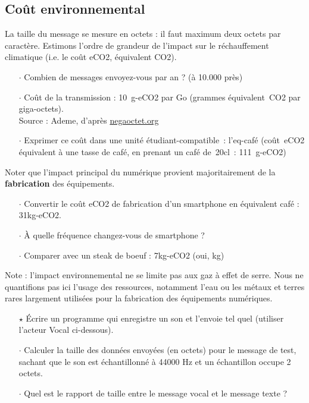 

\subsection*{Coût environnemental}

La taille du message se mesure en octets : il faut maximum deux octets par caractère.
Estimons l'ordre de grandeur de l'impact sur le réchauffement climatique (i.e. le coût eCO2, équivalent CO2).

\begin{itemize}[itemsep=0.2ex]
\item[$\cdot$] Combien de messages envoyez-vous par an ? (à 10.000 près)
\item[$\cdot$] Coût de la transmission : 10~g-eCO2 par Go (grammes équivalent~CO2 par giga-octets).\\
  {\small Source : Ademe, d'après \url{negaoctet.org}}
\item[$\cdot$] Exprimer ce coût dans une unité étudiant-compatible~: l'eq-café (coût~eCO2 équivalent à une tasse de café, en prenant un café de~20cl~: 111~g-eCO2)
\end{itemize}

Noter que l'impact principal du numérique provient majoritairement de la \textbf{fabrication} des équipements.

\begin{itemize}[itemsep=0.2ex]
\item[$\cdot$] Convertir le coût eCO2 de fabrication d'un smartphone en équivalent café : 31kg-eCO2.
\item[$\cdot$] À quelle fréquence changez-vous de smartphone ?
\item[$\cdot$] Comparer avec un steak de boeuf : 7kg-eCO2 (oui, kg) {\footnotesize \color{gray}{(à quelle fréquence mangez-vous du boeuf ?)}}
\end{itemize}

\medskip

Note : l'impact environnemental ne se limite pas aux gaz à effet de serre. Nous ne quantifions pas ici l'usage des ressources, notamment l'eau ou les métaux et terres rares largement utilisées pour la fabrication des équipements numériques.



\begin{itemize}
\item[$\star$] Écrire un programme qui enregistre un son et l'envoie tel quel (utiliser l'acteur Vocal ci-dessous).
\item[$\cdot$] Calculer la taille des données envoyées (en octets) pour le message de test, sachant que le son est échantillonné à 44000 Hz et un échantillon occupe 2 octets.
\item[$\cdot$] Quel est le rapport de taille entre le message vocal et le message texte ?
\end{itemize}

